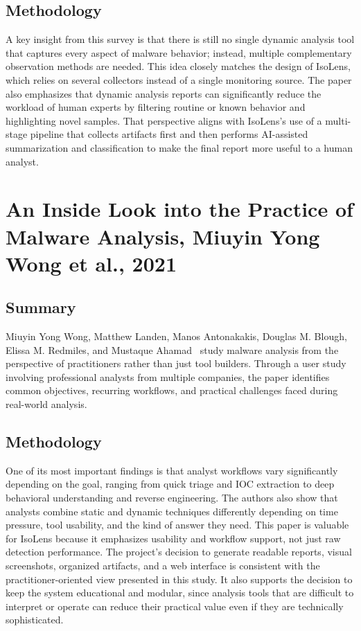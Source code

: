 \documentclass[a4paper,12pt,oneside]{report}
\begin{document}
\subsection{Methodology}
A key insight from this survey is that there is still no single dynamic analysis tool that captures every aspect of malware behavior; instead, multiple complementary observation methods are needed. This idea closely matches the design of IsoLens, which relies on several collectors instead of a single monitoring source. The paper also emphasizes that dynamic analysis reports can significantly reduce the workload of human experts by filtering routine or known behavior and highlighting novel samples. That perspective aligns with IsoLens’s use of a multi-stage pipeline that collects artifacts first and then performs AI-assisted summarization and classification to make the final report more useful to a human analyst.

\section{An Inside Look into the Practice of Malware Analysis, Miuyin Yong Wong et al., 2021}

\subsection{Summary}
Miuyin Yong Wong, Matthew Landen, Manos Antonakakis, Douglas M. Blough, Elissa M. Redmiles, and Mustaque Ahamad~\cite{wong2022} study malware analysis from the perspective of practitioners rather than just tool builders. Through a user study involving professional analysts from multiple companies, the paper identifies common objectives, recurring workflows, and practical challenges faced during real-world analysis.

\subsection{Methodology}
One of its most important findings is that analyst workflows vary significantly depending on the goal, ranging from quick triage and IOC extraction to deep behavioral understanding and reverse engineering. The authors also show that analysts combine static and dynamic techniques differently depending on time pressure, tool usability, and the kind of answer they need. This paper is valuable for IsoLens because it emphasizes usability and workflow support, not just raw detection performance. The project’s decision to generate readable reports, visual screenshots, organized artifacts, and a web interface is consistent with the practitioner-oriented view presented in this study. It also supports the decision to keep the system educational and modular, since analysis tools that are difficult to interpret or operate can reduce their practical value even if they are technically sophisticated.
\end{document}
